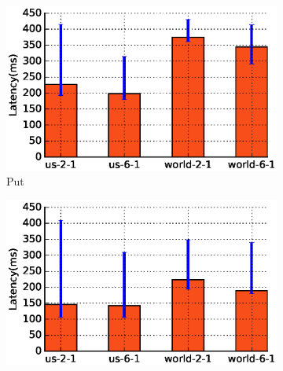 
\begin{figure}[t]
    \begin{subfigure}{0.40\textwidth}
      \includegraphics[width=\linewidth]{plots/giza_four_put}

      \caption{Put}
      \label{fig:eval_giza_put_four}
    \end{subfigure}
%
    \begin{subfigure}{0.40\textwidth}
      \includegraphics[width=\linewidth]{plots/giza_four_get}


\end{subfigure}
\end{figure}
